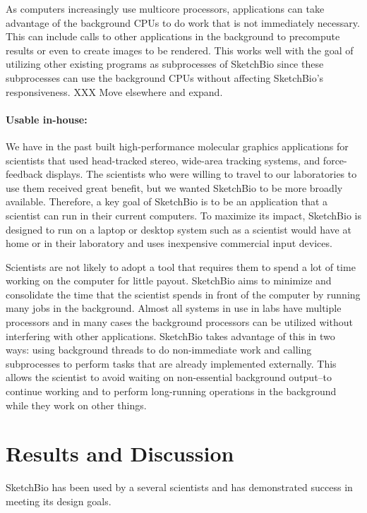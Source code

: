 \documentclass[twocolumn]{bmcart}%
\begin{document}
As computers increasingly use multicore processors, applications can take advantage of the background CPUs to do work that is not immediately necessary.  This can include calls to other applications in the background to precompute results or even to create images to be rendered.  This works well with the goal of utilizing other existing programs as subprocesses of SketchBio since these subprocesses can use the background CPUs without affecting SketchBio's responsiveness.  XXX Move elsewhere and expand.

\paragraph*{Usable in-house:} We have in the past built high-performance molecular graphics applications for scientists that used head-tracked stereo, wide-area tracking systems, and force-feedback displays.  \cite{Arthur}\cite{Grant1998}\cite{Marshburn2005}\cite{Taylor1999}\cite{Taylor1997}\cite{Taylor1994}  The scientists who were willing to travel to our laboratories to use them received great benefit, but we wanted SketchBio to be more broadly available.  Therefore, a key goal of SketchBio is to be an application that a scientist can run in their current computers.  To maximize its impact, SketchBio is designed to run on a laptop or desktop system such as a scientist would have at home or in their laboratory and uses inexpensive commercial input devices.

Scientists are not likely to adopt a tool that requires them to spend a lot of time working on the computer for little payout.  SketchBio aims to minimize and consolidate the time that the scientist spends in front of the computer by running many jobs in the background.  Almost all systems in use in labs have multiple processors and in many cases the background processors can be utilized without interfering with other applications.  SketchBio takes advantage of this in two ways: using background threads to do non-immediate work and calling subprocesses to perform tasks that are already implemented externally.  This allows the scientist to avoid waiting on non-essential background output--to continue working and to perform long-running operations in the background while they work on other things.

\section*{Results and Discussion}
SketchBio has been used by a several scientists and has demonstrated success in meeting its design goals.
\end{document}
